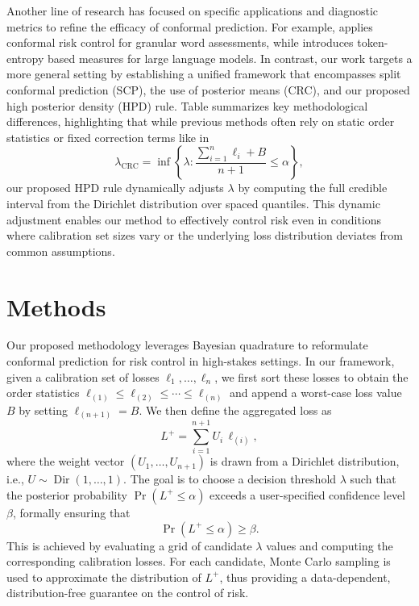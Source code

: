 \documentclass{article} %
\begin{document}
Another line of research has focused on specific applications and diagnostic metrics to refine the efficacy of conformal prediction. For example, \cite{gomes2025conformalriskcontrolframework} applies conformal risk control for granular word assessments, while \cite{xu2025tecptokenentropyconformalprediction} introduces token-entropy based measures for large language models. In contrast, our work targets a more general setting by establishing a unified framework that encompasses split conformal prediction (SCP), the use of posterior means (CRC), and our proposed high posterior density (HPD) rule. Table summarizes key methodological differences, highlighting that while previous methods often rely on static order statistics or fixed correction terms like in
\[
\lambda_{\text{CRC}} = \inf\left\{\lambda : \frac{\sum_{i=1}^n \ell_i + B}{n+1} \leq \alpha\right\},
\]
our proposed HPD rule dynamically adjusts $\lambda$ by computing the full credible interval from the Dirichlet distribution over spaced quantiles. This dynamic adjustment enables our method to effectively control risk even in conditions where calibration set sizes vary or the underlying loss distribution deviates from common assumptions.

\section{Methods}
Our proposed methodology leverages Bayesian quadrature to reformulate conformal prediction for risk control in high-stakes settings. In our framework, given a calibration set of losses \(\ell_1, \dots, \ell_n\), we first sort these losses to obtain the order statistics \(\ell_{(1)} \le \ell_{(2)} \le \cdots \le \ell_{(n)}\) and append a worst-case loss value \(B\) by setting \(\ell_{(n+1)} = B\). We then define the aggregated loss as 
\[
L^+ = \sum_{i=1}^{n+1} U_i \, \ell_{(i)},
\]
where the weight vector \((U_1, \dots, U_{n+1})\) is drawn from a Dirichlet distribution, i.e., \(U \sim \operatorname{Dir}(1,\ldots,1)\). The goal is to choose a decision threshold \(\lambda\) such that the posterior probability \(\Pr(L^+ \le \alpha)\) exceeds a user-specified confidence level \(\beta\), formally ensuring that
\[
\Pr(L^+ \le \alpha) \ge \beta.
\]
This is achieved by evaluating a grid of candidate \(\lambda\) values and computing the corresponding calibration losses. For each candidate, Monte Carlo sampling is used to approximate the distribution of \(L^+\), thus providing a data-dependent, distribution-free guarantee on the control of risk.
\end{document}
